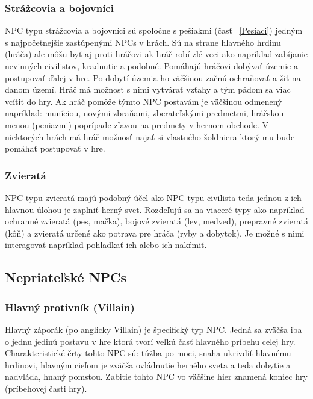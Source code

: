 \documentclass[10pt,twoside,slovak,a4paper]{article}
\begin{document}
\subsubsection{Strážcovia a bojovníci} \label{services}
NPC typu strážcovia a bojovníci sú spoločne s pešiakmi (časť ~\ref{Pesiaci}) jedným s najpočetnejšie zastúpenými NPCs v hrách. Sú na strane hlavného hrdinu (hráča) ale môžu byť aj proti hráčovi ak hráč robí zlé veci ako napríklad zabíjanie nevinných civilistov, kradnutie a podobné. Pomáhajú hráčovi dobývať územie a postupovať ďalej v hre. Po dobytí územia ho väčšinou začnú ochraňovať a žiť na danom území. Hráč má možnosť s nimi vytvárať vzťahy a tým pádom sa viac vcítiť do hry.  Ak hráč pomôže týmto NPC postavám je väčšinou odmenený napríklad: muníciou, novými zbraňami, zberateľskými predmetmi, hráčskou menou (peniazmi) poprípade zľavou na predmety v hernom obchode. V niektorých hrách má hráč možnosť najať si vlastného žoldniera ktorý mu bude pomáhať postupovať v hre.    

\subsubsection{Zvieratá}
NPC typu zvieratá majú podobný účel ako NPC typu civilista teda jednou z ich hlavnou úlohou je zaplniť herný svet. Rozdeľujú sa na viaceré typy ako napríklad ochranné zvieratá (pes, mačka), bojové zvieratá (lev, medveď), prepravné zvieratá (kôň) a zvieratá určené ako potrava pre hráča (ryby a dobytok). Je možné s nimi interagovať napríklad pohladkať ich alebo ich nakŕmiť. 

\subsection{Nepriateľské NPCs} \label{enemy}

\subsubsection{Hlavný protivník (Villain)} \label{BOSS}
Hlavný záporák (po anglicky Villain) je špecifický typ NPC. Jedná sa zväčša iba o jednu jedinú postavu v hre ktorá tvorí veľkú časť hlavného príbehu celej hry. Charakteristické črty tohto NPC sú: túžba po moci, snaha ukrivdiť hlavnému hrdinovi, hlavným cieľom je zväčša ovládnutie herného sveta a teda dobytie a nadvláda, hnaný pomstou. Zabitie tohto NPC vo väčšine hier znamená koniec hry (príbehovej časti hry).
\end{document}
